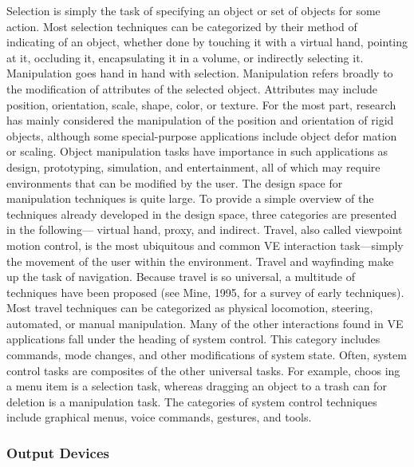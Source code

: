 Selection is simply the task of specifying an object or set of objects for some action. 
Most selection techniques can be categorized by their method of indicating of an object, whether 
done by touching it with a virtual hand, pointing at it, occluding it, encapsulating it in a volume, or 
indirectly selecting it. Manipulation goes hand in hand with selection. Manipulation refers broadly to the  modification of 
attributes of the selected object. Attributes may include position, orientation, scale, shape, color, 
or texture. For the most part, research has mainly considered the manipulation of the  position 
and orientation of rigid objects, although some special-purpose applications include object defor
mation or scaling. Object manipulation tasks have importance in such applications as design, 
prototyping, simulation, and entertainment, all of which may require environments that can be 
modified by the user. The design space for manipulation techniques is quite large. To provide a simple overview of the 
techniques already developed in the design space, three categories are presented in the following—
virtual hand, proxy, and indirect. Travel, also called viewpoint motion control, is the most ubiquitous and common \gls{VE} interaction 
task—simply the movement of the user within the environment. Travel and wayfinding make up the task of navigation. Because travel is so universal, a multitude of techniques have been proposed 
(see Mine, 1995, for a survey of early techniques). Most travel techniques can be categorized as physical locomotion, 
steering, automated, or manual manipulation. Many of the other interactions found in VE applications fall under the heading of system control. 
This category includes commands, mode changes, and other modifications of system state. 
Often, system control tasks are composites of the other universal tasks. For example, choos
ing a menu item is a selection task, whereas dragging an object to a trash can for deletion is a 
manipulation task. The categories of system control techniques include graphical 
menus, voice commands, gestures, and tools.~\cite{hale2014handbook}


\subsubsection{Output Devices}
\label{sec:output_devices}

